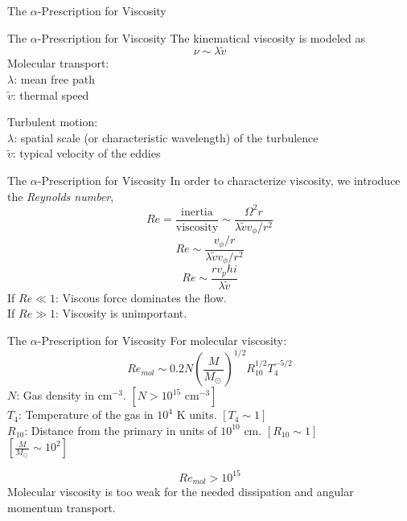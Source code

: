 \documentclass{beamer}
\begin{document}
\begin{frame}
\Huge
The $\alpha$-Prescription for Viscosity
\end{frame}

\begin{frame}{The $\alpha$-Prescription for Viscosity}
	The kinematical viscosity is modeled as
	\[ \nu \sim \lambda \tilde{v}\]
	\pause
	Molecular transport:\\
	$\lambda$: mean free path\\
	$\tilde{v}$: thermal speed\\
	\bigskip
	\pause
	
	Turbulent motion:\\
	$\lambda$: spatial scale (or characteristic wavelength) of the turbulence\\
	$\tilde{v}$: typical velocity of the eddies\\
\end{frame}

\begin{frame}{The $\alpha$-Prescription for Viscosity}
	In order to characterize viscosity, we introduce the \textit{Reynolds number},
	\[Re = \frac{\textrm{inertia}}{\textrm{viscosity}} \sim \frac{\Omega^2 r}{\lambda \tilde{v} v_\phi / r^2}\] 
	\pause
	\[Re  \sim \frac{v_\phi / r}{\lambda \tilde{v} v_\phi / r^2}\] 
	\pause
	\[Re \sim \frac{rv_phi}{\lambda \tilde{v}}\]
	\pause
	If $Re\ll 1$: Viscous force dominates the flow.\\
	\pause
	If $Re\gg 1$: Viscosity is unimportant.
\end{frame}

\begin{frame}{The $\alpha$-Prescription for Viscosity}
	For molecular viscosity:
	\pause
	\[ Re_{mol} \sim 0.2 N \left( \frac{M}{M_{\odot\ }}\right)^{1/2} R_{10} ^{1/2} T_4^{-5/2} \]
	\pause
	$N$: Gas density in $\textrm{cm}^{-3}$. $\left[ N >10^{15} \textrm{ cm}^{-3} \right]$\\
	$T_4$: Temperature of the gas in $10^4 \textrm{ K}$ units. $\left[ T_4 \sim 1 \right]$\\
	$R_{10}$: Distance from the primary in units of $10^{10} \textrm{ cm}$. $\left[ R_{10} \sim 1 \right]$\\
	$\left[ \frac{M}{M_{\odot\ }} \sim 10^2 \right]$\\
	\pause
	
	\[ Re_{mol} > 10^{15} \]
	\pause
	Molecular viscosity is too weak for the needed dissipation  and angular momentum transport.
\end{frame}
\end{document}
